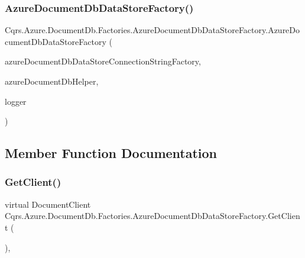 \subsubsection{\texorpdfstring{Azure\+Document\+Db\+Data\+Store\+Factory()}{AzureDocumentDbDataStoreFactory()}}
{\footnotesize\ttfamily Cqrs.\+Azure.\+Document\+Db.\+Factories.\+Azure\+Document\+Db\+Data\+Store\+Factory.\+Azure\+Document\+Db\+Data\+Store\+Factory (\begin{DoxyParamCaption}\item[{\hyperlink{interfaceCqrs_1_1Azure_1_1DocumentDb_1_1Factories_1_1IAzureDocumentDbDataStoreConnectionStringFactory}{I\+Azure\+Document\+Db\+Data\+Store\+Connection\+String\+Factory}}]{azure\+Document\+Db\+Data\+Store\+Connection\+String\+Factory,  }\item[{\hyperlink{interfaceCqrs_1_1Azure_1_1DocumentDb_1_1IAzureDocumentDbHelper}{I\+Azure\+Document\+Db\+Helper}}]{azure\+Document\+Db\+Helper,  }\item[{I\+Logger}]{logger }\end{DoxyParamCaption})}



\subsection{Member Function Documentation}
\mbox{\label{classCqrs_1_1Azure_1_1DocumentDb_1_1Factories_1_1AzureDocumentDbDataStoreFactory_a4e7ff98b4f48fdc078a12f97c39d1bbb}} 
\subsubsection{\texorpdfstring{Get\+Client()}{GetClient()}}
{\footnotesize\ttfamily virtual Document\+Client Cqrs.\+Azure.\+Document\+Db.\+Factories.\+Azure\+Document\+Db\+Data\+Store\+Factory.\+Get\+Client (\begin{DoxyParamCaption}{ }\end{DoxyParamCaption})\hspace{0.3cm}{\ttfamily [protected]}, {\ttfamily [virtual]}}


